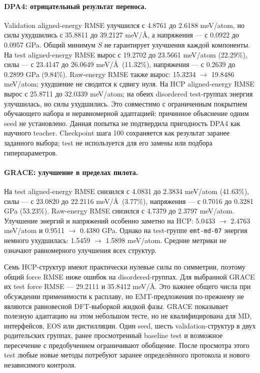 \documentclass[11pt,a4paper]{article}
\begin{document}
\paragraph{DPA4: отрицательный результат переноса.}
Validation aligned-energy RMSE улучшился с 4.8761 до 2.6188 meV/atom,
но силы ухудшились с 35.8811 до 39.2127 meV/\AA, а напряжения ---
с 0.0922 до 0.0957 GPa. Общий минимум $S$ не гарантирует
улучшения каждой компоненты. На test aligned-energy RMSE вырос
с 19.2702 до 23.5661 meV/atom (22.29\%), силы ---
с 23.4147 до 26.0649 meV/\AA\ (11.32\%), напряжения ---
с 0.2639 до 0.2899 GPa (9.84\%). Raw-energy RMSE также вырос:
15.3234 $\to$ 19.8486 meV/atom; ухудшение не сводится к сдвигу нуля.
На HCP aligned-energy RMSE вырос с 25.8711 до 32.0339 meV/atom;
на обеих disordered test-группах энергия улучшилась, но силы ухудшились.
Это совместимо с ограниченным покрытием обучающего набора и
неравномерной адаптацией; причинное объяснение одним seed не установлено.
Данная попытка не подтвердила пригодность DPA4 как научного teacher.
Checkpoint шага 100 сохраняется как результат заранее заданного выбора;
test не используется для его замены или подбора гиперпараметров.

\paragraph{GRACE: улучшение в пределах пилота.}
На test aligned-energy RMSE снизился с 4.0831 до 2.3834 meV/atom
(41.63\%), силы --- с 23.0820 до 22.2116 meV/\AA\ (3.77\%),
напряжения --- с 0.7016 до 0.3281 GPa (53.23\%).
Raw-energy RMSE снизился с 4.7379 до 2.3797 meV/atom.
Улучшение энергий и напряжений особенно заметно на HCP:
5.0433 $\to$ 2.4763 meV/atom и 0.9511 $\to$ 0.4380 GPa.
Однако на test-группе \texttt{emt-md-07} энергия немного ухудшилась:
1.5459 $\to$ 1.5898 meV/atom. Средние метрики не означают
равномерного улучшения всех структур.

Семь HCP-структур имеют практически нулевые силы по симметрии,
поэтому общий force RMSE ниже ошибок на disordered-группах.
Для выбранной GRACE их test force RMSE --- 29.2111 и
35.8412 meV/\AA. Это важнее общего числа при обсуждении
применимости к расплаву, но EMT-предложения по-прежнему не являются
равновесной DFT-выборкой жидкой фазы.
GRACE показывает полезную адаптацию на этом небольшом тесте,
но не квалифицирована для MD, интерфейсов, EOS или дистилляции.
Один seed, шесть validation-структур в двух родительских группах,
ранее просмотренный baseline test и возможное пересечение с предобучением
ограничивают обобщение. После просмотра этого test любые новые методы
потребуют заранее определённого протокола и нового независимого контроля.
\end{document}
